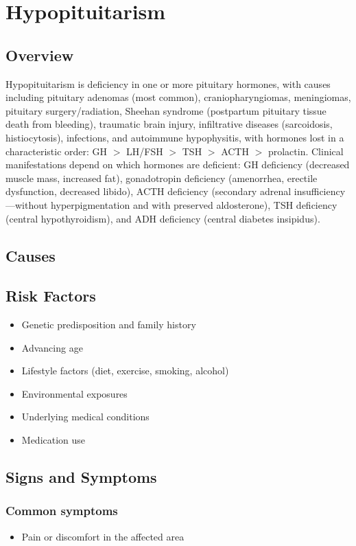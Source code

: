 \chapter{Hypopituitarism}
\label{sec:Hypopituitarism}

\section{Overview}
Hypopituitarism is deficiency in one or more pituitary hormones, with causes including pituitary adenomas (most common), craniopharyngiomas, meningiomas, pituitary surgery/radiation, Sheehan syndrome (postpartum pituitary tissue death from bleeding), traumatic brain injury, infiltrative diseases (sarcoidosis, histiocytosis), infections, and autoimmune hypophysitis, with hormones lost in a characteristic order: GH $>$ LH/FSH $>$ TSH $>$ ACTH $>$ prolactin. Clinical manifestations depend on which hormones are deficient: GH deficiency (decreased muscle mass, increased fat), gonadotropin deficiency (amenorrhea, erectile dysfunction, decreased libido), ACTH deficiency (secondary adrenal insufficiency---without hyperpigmentation and with preserved aldosterone), TSH deficiency (central hypothyroidism), and ADH deficiency (central diabetes insipidus).
\section{Causes}
\section{Risk Factors}

\begin{itemize}[noitemsep]
  \item Genetic predisposition and family history
  \item Advancing age
  \item Lifestyle factors (diet, exercise, smoking, alcohol)
  \item Environmental exposures
  \item Underlying medical conditions
  \item Medication use
\end{itemize}
\section{Signs and Symptoms}

\subsection{Common symptoms}
\begin{itemize}[noitemsep]
  \item Pain or discomfort in the affected area
  \end{itemize}

